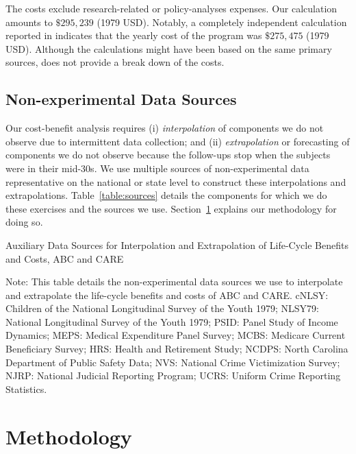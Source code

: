 The costs exclude research-related or policy-analyses expenses. Our calculation amounts to $\$295,239$ (1979 USD). Notably, a completely independent calculation reported in \citet{FPG_1979_Progress-Report} indicates that the yearly cost of the program was $\$275,475$  (1979 USD). Although the calculations might have been based on the same primary sources, \citet{FPG_1979_Progress-Report} does not provide a break down of the costs.

\subsection{Non-experimental Data Sources}

Our cost-benefit analysis requires (i) \textit{interpolation} of components we do not observe due to intermittent data collection; and (ii) \textit{extrapolation} or forecasting of components we do not observe because the follow-ups stop when the subjects were in their mid-30s. We use multiple sources of non-experimental data representative on the national or state level to construct these interpolations and extrapolations. Table~\ref{table:sources} details the components for which we do these exercises and the sources we use. Section~\ref{section:methodology} explains our methodology for doing so.

\begin{table}[H]
\begin{threeparttable}
\caption{Auxiliary Data Sources for Interpolation and Extrapolation of Life-Cycle Benefits and Costs, ABC and CARE} \label{table:sources}
\footnotesize

\begin{tablenotes}
\footnotesize
Note: This table details the non-experimental data sources we use to interpolate and extrapolate the life-cycle benefits and costs of ABC and CARE. cNLSY: Children of the National Longitudinal Survey of the Youth 1979; NLSY79: National Longitudinal Survey of the Youth 1979; PSID: Panel Study of Income Dynamics; MEPS: Medical Expenditure Panel Survey; MCBS: Medicare Current Beneficiary Survey; HRS: Health and Retirement Study; NCDPS: North Carolina Department of Public Safety Data; NVS: National Crime Victimization Survey; NJRP: National Judicial Reporting Program; UCRS: Uniform Crime Reporting Statistics.
\end{tablenotes}
\end{threeparttable}
\end{table}

\section{Methodology} \label{section:methodology}

